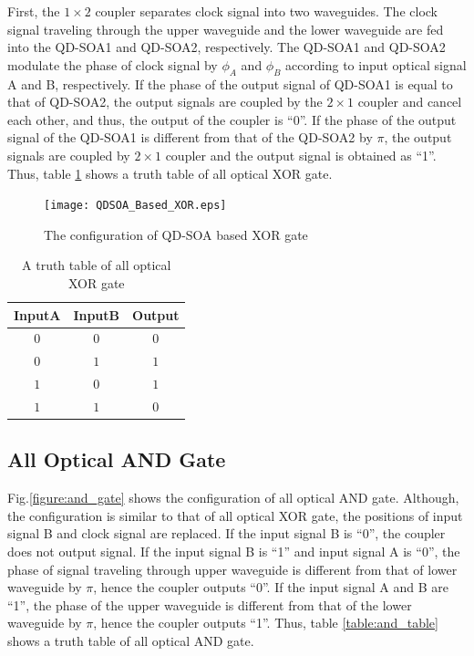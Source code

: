 \documentclass[twocolumn,a4paper]{article}
\begin{document}
First, the $1 \times 2$ coupler separates clock signal into two waveguides. The clock signal traveling through the upper waveguide and the lower waveguide are fed into the QD-SOA1 and QD-SOA2, respectively. The QD-SOA1 and QD-SOA2 modulate the phase of clock signal by $\phi_{A}$ and $\phi_{B}$ according to input optical signal A and B, respectively. If the phase of the output signal of QD-SOA1 is equal to that of QD-SOA2, the output signals are coupled by the $2 \times 1$ coupler and cancel each other, and thus, the output of the coupler is ``0''. If the phase of the output signal of the QD-SOA1 is different from that of the QD-SOA2 by $\pi$, the output signals are coupled by $2 \times 1$ coupler and the output signal is obtained as ``1''. Thus, table {\ref{table:xor_table}} shows a truth table of all optical XOR gate.

\begin{figure}[htbp]
\begin{center}
  \texttt{[image: QDSOA\_Based\_XOR.eps]}
  \caption{The configuration of QD-SOA based XOR gate}
 \label{figure:xor_gate}
\end{center}
\end{figure}

\renewcommand{\arraystretch}{1.5}
\begin{table}[htbp]
\begin{center}
 \small
 \caption{A truth table of all optical XOR gate}
 \label{table:xor_table}
 \begin{tabular}{c c c}
  \hline
  InputA & InputB & Output \\
  \hline
  $0$ & $0$ & $0$ \\
  $0$ & $1$ & $1$ \\
  $1$ & $0$ & $1$ \\
  $1$ & $1$ & $0$ \\
  \hline
  \end{tabular}
\end{center}
\end{table}
\renewcommand{\arraystretch}{1.0}

\newpage

\subsection{All Optical AND Gate}
Fig.{\ref{figure:and_gate}} shows the configuration of all optical AND gate{\cite{80Gbps}}. Although, the configuration is similar to that of all optical XOR gate, the positions of input signal B and clock signal are replaced. If the input signal B is ``0'', the coupler does not output signal. If the input signal B is ``1'' and input signal A is ``0'', the phase of signal traveling through upper waveguide is different from that of lower waveguide by $\pi$, hence the coupler outputs ``0''. If the input signal A and B are ``1'', the phase of the upper waveguide is different from that of the lower waveguide by $\pi$, hence the coupler outputs ``1''. Thus, table {\ref{table:and_table}} shows a truth table of all optical AND gate.
\end{document}
